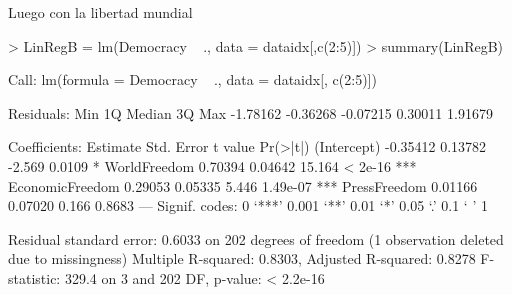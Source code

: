 \documentclass{article}
\begin{document}
Luego con la libertad mundial

\begin{Schunk}
\begin{Sinput}
> LinRegB = lm(Democracy ~ ., data = dataidx[,c(2:5)])
> summary(LinRegB)
\end{Sinput}
\begin{Soutput}
Call:
lm(formula = Democracy ~ ., data = dataidx[, c(2:5)])

Residuals:
     Min       1Q   Median       3Q      Max 
-1.78162 -0.36268 -0.07215  0.30011  1.91679 

Coefficients:
                Estimate Std. Error t value Pr(>|t|)    
(Intercept)     -0.35412    0.13782  -2.569   0.0109 *  
WorldFreedom     0.70394    0.04642  15.164  < 2e-16 ***
EconomicFreedom  0.29053    0.05335   5.446 1.49e-07 ***
PressFreedom     0.01166    0.07020   0.166   0.8683    
---
Signif. codes:  0 ‘***’ 0.001 ‘**’ 0.01 ‘*’ 0.05 ‘.’ 0.1 ‘ ’ 1

Residual standard error: 0.6033 on 202 degrees of freedom
  (1 observation deleted due to missingness)
Multiple R-squared:  0.8303,	Adjusted R-squared:  0.8278 
F-statistic: 329.4 on 3 and 202 DF,  p-value: < 2.2e-16
\end{Soutput}
\end{Schunk}
\end{document}
